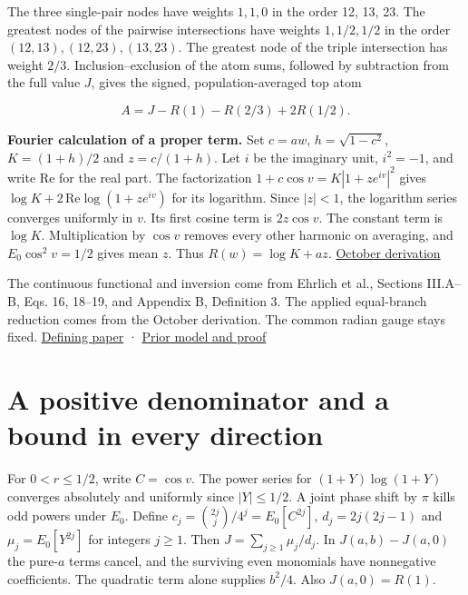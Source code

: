 The three single-pair nodes have weights \(1,1,0\) in the order 12, 13, 23. The greatest nodes of the pairwise intersections have weights \(1,1/2,1/2\) in the order \((12,13),(12,23),(13,23)\). The greatest node of the triple intersection has weight \(2/3\). Inclusion--exclusion of the atom sums, followed by subtraction from the full value \(J\), gives the signed, population-averaged top atom

\[
A=J-R(1)-R(2/3)+2R(1/2).
\]

\textbf{Fourier calculation of a proper term.} Set \(c=aw\), \(h=\sqrt{1-c^2}\), \(K=(1+h)/2\) and \(z=c/(1+h)\). Let \(i\) be the imaginary unit, \(i^2=-1\), and write \(\mathrm{Re}\) for the real part. The factorization \(1+c\cos v=K|1+ze^{iv}|^2\) gives \(\log K+2\,\mathrm{Re}\log(1+ze^{iv})\) for its logarithm. Since \(|z|<1\), the logarithm series converges uniformly in \(v\). Its first cosine term is \(2z\cos v\). The constant term is \(\log K\). Multiplication by \(\cos v\) removes every other harmonic on averaging, and \(E_0\cos^2v=1/2\) gives mean \(z\). Thus \(R(w)=\log K+az\). \href{https://github.com/sepahead/pid-rs/blob/main/audit/archive/angular-relative-bound-20261005/derivation.md.txt}{October derivation}

The continuous functional and inversion come from Ehrlich et al., Sections III.A--B, Eqs. 16, 18--19, and Appendix B, Definition 3. The applied equal-branch reduction comes from the October derivation. The common radian gauge stays fixed. \href{https://arxiv.org/html/2311.06373v3}{Defining paper} · \href{https://github.com/sepahead/pid-rs/blob/main/audit/archive/angular-relative-bound-20261005/derivation.md.txt}{Prior model and proof}

\clearpage

\section{A positive denominator and a bound in every direction}\label{a-positive-denominator-and-a-bound-in-every-direction}

For \(0<r\le1/2\), write \(C=\cos v\). The power series for \((1+Y)\log(1+Y)\) converges absolutely and uniformly since \(|Y|\le1/2\). A joint phase shift by \(\pi\) kills odd powers under \(E_0\). Define \(c_j=\binom{2j}{j}/4^j=E_0[C^{2j}]\), \(d_j=2j(2j-1)\) and \(\mu_j=E_0[Y^{2j}]\) for integers \(j\ge1\). Then \(J=\sum_{j\ge1}\mu_j/d_j\). In \(J(a,b)-J(a,0)\) the pure-\(a\) terms cancel, and the surviving even monomials have nonnegative coefficients. The quadratic term alone supplies \(b^2/4\). Also \(J(a,0)=R(1)\).

